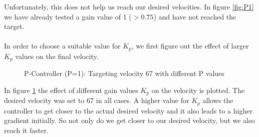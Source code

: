 Unfortunately, this does not help us reach our desired velocities. In figure \ref{fig:P1} we have already tested a gain value of 1 ($>0.75$) and have not reached the target.\\\\
In order to choose a suitable value for $K_p$, we first figure out the effect of larger $K_p$ values on the final velocity.
\\
\begin{figure}[H]
    \centering
{}
    \caption{P-Controller (P=1): Targeting velocity 67 with different P values} \label{fig:P_demo}
\end{figure}
In figure \ref{fig:P_demo} the effect of different gain values $K_p$ on the velocity is plotted. The desired velocity was set to 67 in all cases. A higher value for $K_p$ allows the controller to get closer to the actual desired velocity and it also leads to a higher gradient initially. So not only do we get closer to our desired velocity, but we also reach it faster.\\

